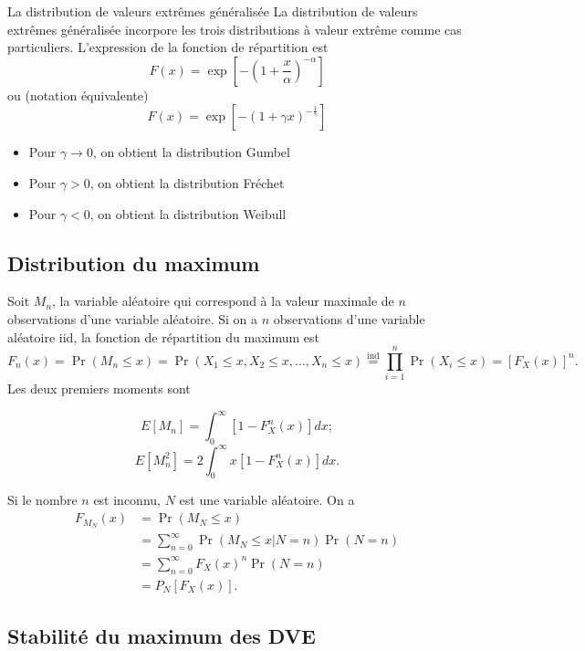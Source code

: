 \begin{definition}{La distribution de valeurs extrêmes généralisée}{}
	La distribution de valeurs extrêmes généralisée incorpore les trois distributions à valeur extrême comme cas particuliers. L'expression de la fonction de répartition est 
	$$F(x) = \exp \left[-\left(1 + \frac{x}{\alpha}\right)^{-\alpha}\right]$$
	ou (notation équivalente)
	$$F(x) = \exp \left[-\left(1 + \gamma x\right)^{-\frac{1}{\gamma}}\right]$$
	\tcblower
	\begin{itemize}
		\item Pour $\gamma \to 0$, on obtient la distribution Gumbel
		\item Pour $\gamma  > 0$, on obtient la distribution Fréchet
		\item Pour $\gamma < 0$, on obtient la distribution Weibull
	\end{itemize}
\end{definition}

\subsection{Distribution du maximum}

Soit $M_{n}$, la variable aléatoire qui correspond à la valeur maximale de $n$ observations d'une variable aléatoire. Si on a $n$ observations d'une variable aléatoire iid, la fonction de répartition du maximum est 
$$F_{n}(x) = \Pr(M_n \leq x) = \Pr(X_1\leq x, X_2 \leq x, \dots, X_n \leq x) \stackrel{\text{ind}}{=} \prod_{i = 1}^{n} \Pr(X_i\leq x) = \left[F_{X}(x)\right]^n.$$
Les deux premiers moments sont

$$E\left[M_n\right] = \int_{0}^{\infty} [1 - F_{X}^n(x)] dx;$$
$$E\left[M_n^2\right] = 2\int_{0}^{\infty} x[1 - F_{X}^n(x)] dx.$$

Si le nombre $n$ est inconnu, $N$ est une variable aléatoire. On a 
\begin{align*}
F_{M_{N}}(x) &= \Pr(M_{N} \leq x) \\
&= \sum_{n = 0}^{\infty} \Pr(M_{N} \leq x \vert N = n) \Pr(N = n)\\
&= \sum_{n = 0}^{\infty} F_X(x)^n \Pr(N = n)\\
&= P_N\left[F_{X}(x)\right].
\end{align*}

\subsection{Stabilité du maximum des DVE}

